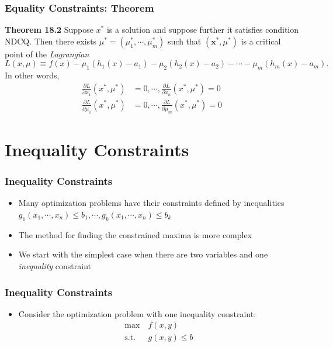 \documentclass[9pt,aspectratio=169]{beamer}
\begin{document}
\begin{frame}
	\frametitle{Equality Constraints: Theorem}
	\begin{block}{\textbf{Theorem 18.2}}
		Suppose $x^*$ is a solution and suppose further it satisfies
        condition NDCQ. Then there exists $\mu^* = (\mu_1^*, \cdots,
        \mu_m^*)$ such that $(\mathbf x^*,\mu^*)$ is a critical
        point of the \emph{Lagrangian} \small
		\begin{equation*}
            L(x,\mu) \equiv f(x)-\mu_1(h_1(x)-a_1)-\mu_2(h_2(x)-a_2)
            - \cdots - \mu_m(h_m(x)-a_m).
		\end{equation*}
	 In other words, 
		\begin{align}
            \frac{\partial L}{\partial x_1}(x^*,\mu^*) &=0,
            \cdots, \frac{\partial L}{\partial
              x_n}(x^*,\mu^*)=0 \nonumber \\ 
            \frac{\partial L}{\partial \mu_1}(x^*,\mu^*) &
            =0,\cdots, \frac{\partial L}{\partial
              \mu_m}(x^*,\mu^*)=0 \nonumber
	\end{align}	
	\end{block}
\end{frame}

	

	
	
	
	

	

\section{Inequality Constraints}
\begin{frame}
	\frametitle{Inequality Constraints}
\begin{itemize}
	\item Many optimization problems have their constraints defined by inequalities
	$g_1(x_1,\cdots,x_n)\leq b_1,\cdots,g_k(x_1,\cdots,x_n)\leq b_k$
	\item The method for finding the constrained maxima is more complex
	\item We start with the simplest case when there are two variables and
    one \emph{inequality} constraint
\end{itemize}
\end{frame}	

\begin{frame}
	\frametitle{Inequality Constraints}
	\begin{itemize}
		\item Consider the optimization problem with one inequality constraint:
		\begin{align}
		\max\  & f(x,y) \nonumber  \\
		\text{s.t.}\ \ & g(x,y)\leq b \nonumber 
		\end{align}
	\end{itemize}
\end{frame}	
\end{document}
